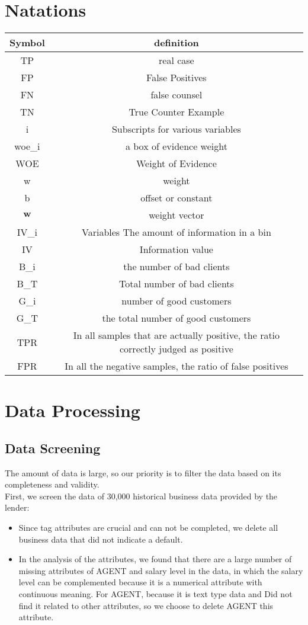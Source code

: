 \documentclass{mcmthesis}
\begin{document}
\section{Natations}
\begin{tabular}{cc}
\toprule
Symbol & definition\\
\hline
TP & real case \\
\hline
FP & False Positives\\
\hline
FN & false counsel\\
\hline
TN & True Counter Example\\
\hline
i & Subscripts for various variables \\
\hline
woe\_i & a box of evidence weight \\
\hline
WOE & Weight of Evidence \\
\hline
w & weight \\
\hline
b & offset or constant \\
\hline
$\mathbf{w}$ & weight vector \\
\hline
IV\_i & Variables The amount of information in a bin \\
\hline
IV & Information value \\
\hline
B\_i & the number of bad clients \\
\hline
B\_T & Total number of bad clients \\
\hline
G\_i & number of good customers \\
\hline
G\_T & the total number of good customers \\
\hline
TPR & In all samples that are actually positive, the ratio correctly judged as positive\\
\hline
FPR & In all the negative samples, the ratio of false positives\\
\hline
\end{tabular}

\section{Data Processing}
\subsection{Data Screening}
The amount of data is large, so our priority is to filter the data based on its completeness and validity.\\
First, we screen the data of 30,000 historical business data provided by the lender:\\
\begin{itemize}
\item Since tag attributes are crucial and can not be completed, we delete all business data that did not indicate a default.
\item In the analysis of the attributes, we found that there are a large number of missing attributes of AGENT and salary level in the data, in which the salary level can be complemented because it is a numerical attribute with continuous meaning. For AGENT, because it is text type data and Did not find it related to other attributes, so we choose to delete AGENT this attribute.
\end{itemize}
\end{document}
